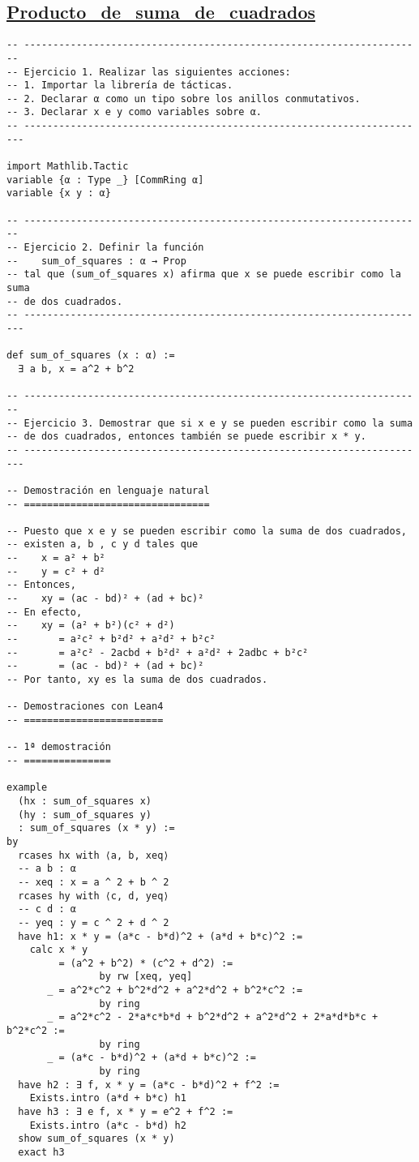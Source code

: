 \subsection{\href{./src/Logica/Producto\_de\_suma\_de\_cuadrados.lean}{Producto\_de\_suma\_de\_cuadrados}}
\label{sec:org672a3e8}
\begin{verbatim}
-- ---------------------------------------------------------------------
-- Ejercicio 1. Realizar las siguientes acciones:
-- 1. Importar la librería de tácticas.
-- 2. Declarar α como un tipo sobre los anillos conmutativos.
-- 3. Declarar x e y como variables sobre α.
-- ----------------------------------------------------------------------

import Mathlib.Tactic
variable {α : Type _} [CommRing α]
variable {x y : α}

-- ---------------------------------------------------------------------
-- Ejercicio 2. Definir la función
--    sum_of_squares : α → Prop
-- tal que (sum_of_squares x) afirma que x se puede escribir como la suma
-- de dos cuadrados.
-- ----------------------------------------------------------------------

def sum_of_squares (x : α) :=
  ∃ a b, x = a^2 + b^2

-- ---------------------------------------------------------------------
-- Ejercicio 3. Demostrar que si x e y se pueden escribir como la suma
-- de dos cuadrados, entonces también se puede escribir x * y.
-- ----------------------------------------------------------------------

-- Demostración en lenguaje natural
-- ================================

-- Puesto que x e y se pueden escribir como la suma de dos cuadrados,
-- existen a, b , c y d tales que
--    x = a² + b²
--    y = c² + d²
-- Entonces,
--    xy = (ac - bd)² + (ad + bc)²
-- En efecto,
--    xy = (a² + b²)(c² + d²)
--       = a²c² + b²d² + a²d² + b²c²
--       = a²c² - 2acbd + b²d² + a²d² + 2adbc + b²c²
--       = (ac - bd)² + (ad + bc)²
-- Por tanto, xy es la suma de dos cuadrados.

-- Demostraciones con Lean4
-- ========================

-- 1ª demostración
-- ===============

example
  (hx : sum_of_squares x)
  (hy : sum_of_squares y)
  : sum_of_squares (x * y) :=
by
  rcases hx with ⟨a, b, xeq⟩
  -- a b : α
  -- xeq : x = a ^ 2 + b ^ 2
  rcases hy with ⟨c, d, yeq⟩
  -- c d : α
  -- yeq : y = c ^ 2 + d ^ 2
  have h1: x * y = (a*c - b*d)^2 + (a*d + b*c)^2 :=
    calc x * y
         = (a^2 + b^2) * (c^2 + d^2) :=
                by rw [xeq, yeq]
       _ = a^2*c^2 + b^2*d^2 + a^2*d^2 + b^2*c^2 :=
                by ring
       _ = a^2*c^2 - 2*a*c*b*d + b^2*d^2 + a^2*d^2 + 2*a*d*b*c + b^2*c^2 :=
                by ring
       _ = (a*c - b*d)^2 + (a*d + b*c)^2 :=
                by ring
  have h2 : ∃ f, x * y = (a*c - b*d)^2 + f^2 :=
    Exists.intro (a*d + b*c) h1
  have h3 : ∃ e f, x * y = e^2 + f^2 :=
    Exists.intro (a*c - b*d) h2
  show sum_of_squares (x * y)
  exact h3


\end{verbatim}
